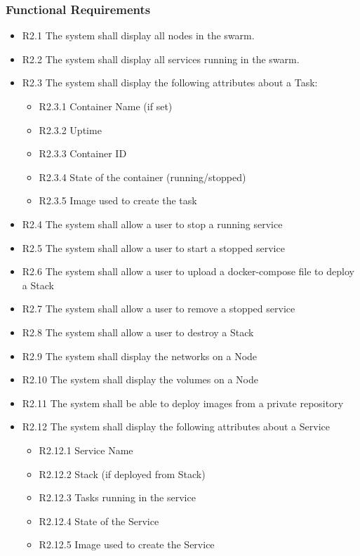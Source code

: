 \documentclass[]{article}
\begin{document}
\subsubsection{Functional Requirements}
\begin{itemize}
	\item R2.1 The system shall display all nodes in the swarm.
	\item R2.2 The system shall display all services running in the swarm.
	\item R2.3 The system shall display the following attributes about a Task:
	      \begin{itemize}
		      \item R2.3.1 Container Name (if set)
		      \item R2.3.2 Uptime
		      \item R2.3.3 Container ID
		      \item R2.3.4 State of the container (running/stopped)
		      \item R2.3.5 Image used to create the task
	      \end{itemize}
	\item R2.4 The system shall allow a user to stop a running service
	\item R2.5 The system shall allow a user to start a stopped service
	\item R2.6 The system shall allow a user to upload a docker-compose file to deploy a Stack
	\item R2.7 The system shall allow a user to remove a stopped service
	\item R2.8 The system shall allow a user to destroy a Stack
	\item R2.9 The system shall display the networks on a Node
	\item R2.10 The system shall display the volumes on a Node
	\item R2.11 The system shall be able to deploy images from a private repository
	\item R2.12 The system shall display the following attributes about a Service
	      \begin{itemize}
		      \item R2.12.1 Service Name
		      \item R2.12.2 Stack (if deployed from Stack)
		      \item R2.12.3 Tasks running in the service
		      \item R2.12.4 State of the Service
		      \item R2.12.5 Image used to create the Service
	      \end{itemize}
\end{itemize}
\end{document}
